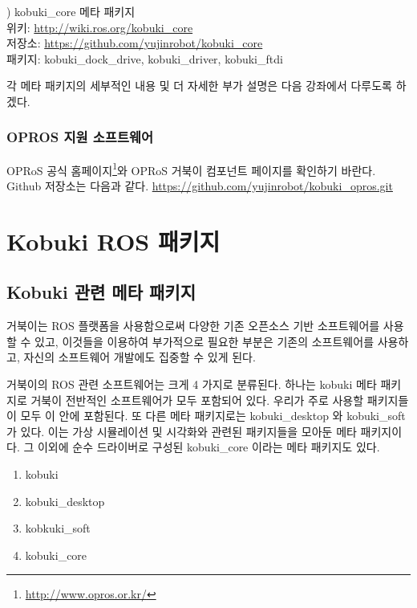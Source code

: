 \vspace{\baselineskip}
\noindent
{}
\thenum) kobuki\_core 메타 패키지\\
위키: \url{http://wiki.ros.org/kobuki_core}\\
저장소: \url{https://github.com/yujinrobot/kobuki_core}\\
패키지: kobuki\_dock\_drive, kobuki\_driver, kobuki\_ftdi

\vspace{\baselineskip}
\noindent
각 메타 패키지의 세부적인 내용 및 더 자세한 부가 설명은 다음 강좌에서 다루도록 하겠다.

\subsubsection{OPROS 지원 소프트웨어}

OPRoS 공식 홈페이지\footnote{\url{http://www.opros.or.kr/}}와 OPRoS 거북이 컴포넌트 페이지를 확인하기 바란다. Github 저장소는 다음과 같다.
\url{https://github.com/yujinrobot/kobuki_opros.git}

\section{Kobuki ROS 패키지}

\subsection{Kobuki 관련 메타 패키지}

거북이는 ROS 플랫폼을 사용함으로써 다양한 기존 오픈소스 기반 소프트웨어를 사용할 수 있고, 이것들을 이용하여 부가적으로 필요한 부분은 기존의 소프트웨어를 사용하고, 자신의 소프트웨어 개발에도 집중할 수 있게 된다. 

거북이의 ROS 관련 소프트웨어는 크게 4 가지로 분류된다. 하나는 kobuki 메타 패키지로 거북이 전반적인 소프트웨어가 모두 포함되어 있다. 우리가 주로 사용할 패키지들이 모두 이 안에 포함된다. 또 다른 메타 패키지로는 kobuki\_desktop 와 kobuki\_soft 가 있다. 이는 가상 시뮬레이션 및 시각화와 관련된 패키지들을 모아둔 메타 패키지이다. 그 이외에 순수 드라이버로 구성된 kobuki\_core 이라는 메타 패키지도 있다.

\begin{enumerate}
\item kobuki
\item kobuki\_desktop
\item kobkuki\_soft
\item kobuki\_core
\end{enumerate}


